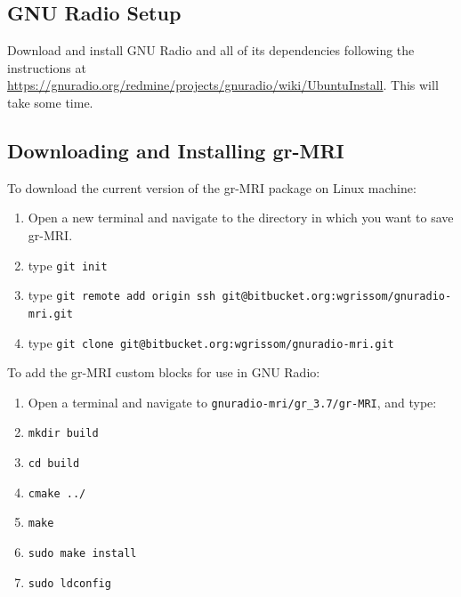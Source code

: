 \documentclass[11pt, oneside]{article}   	%
\begin{document}
\subsection{GNU Radio Setup}

\indent Download and install GNU Radio and all of its dependencies following the instructions at \url{https://gnuradio.org/redmine/projects/gnuradio/wiki/UbuntuInstall}.  This will take some time.


\subsection{Downloading and Installing gr-MRI}

\indent To download the current version of the gr-MRI package on Linux machine:
\begin{enumerate}
	\item Open a new terminal and navigate to the directory in which you want to save gr-MRI.
	\item type \texttt{git init} 
	\item type \texttt{git remote add origin ssh git@bitbucket.org:wgrissom/gnuradio-mri.git}
	\item type \texttt{git clone git@bitbucket.org:wgrissom/gnuradio-mri.git}
\end{enumerate}

\indent To add the gr-MRI custom blocks for use in GNU Radio:
\begin{enumerate}
	\item Open a terminal and navigate to \texttt{gnuradio-mri/gr\_3.7/gr-MRI}, and type:
	\item \texttt{mkdir build}
	\item \texttt{cd build}
	\item \texttt{cmake ../}
	\item \texttt{make}
	\item \texttt{sudo make install}
	\item \texttt{sudo ldconfig}
\end{enumerate}
\end{document}
